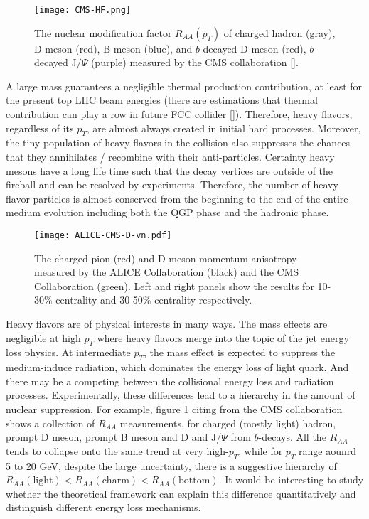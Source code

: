 \begin{figure}
\centering
\texttt{[image: CMS-HF.png]}
\caption{The nuclear modification factor $R_{AA}(p_T)$ of charged hadron (gray), D meson (red), B meson (blue), and $b$-decayed D meson (red), $b$-decayed J$/\Psi$ (purple) measured by the CMS collaboration [].}
\label{fig:intro:Raa}
\end{figure}

A large mass guarantees a negligible thermal production contribution, at least for the present top LHC beam energies (there are estimations that thermal contribution can play a row in future FCC collider []).
Therefore, heavy flavors, regardless of its $p_T$, are almost always created in initial hard processes.
Moreover, the tiny population of heavy flavors in the collision also suppresses the chances that they annihilates / recombine with their anti-particles.
Certainty heavy mesons have a long life time such that the decay vertices are outside of the fireball and can be resolved by experiments.
Therefore, the number of heavy-flavor particles is almost conserved from the beginning to the end of the entire medium evolution including both the QGP phase and the hadronic phase.

\begin{figure}
\centering
\texttt{[image: ALICE-CMS-D-vn.pdf]}
\caption{The charged pion (red) and D meson momentum anisotropy measured by the ALICE Collaboration (black) and the CMS Collaboration (green). Left and right panels show the results for 10-30\% centrality and 30-50\% centrality respectively.}
\label{fig:intro:D-vn}
\end{figure}

Heavy flavors are of physical interests in many ways.
The mass effects are negligible at high $p_T$ where heavy flavors merge into the topic of the jet energy loss physics.
At intermediate $p_T$, the mass effect is expected to suppress the medium-induce radiation, which dominates the energy loss of light quark.
And there may be a competing between the collisional energy loss and radiation processes.
Experimentally, these differences lead to a hierarchy in the amount of nuclear suppression.
For example, figure \ref{fig:intro:Raa} citing from the CMS collaboration shows a collection of $R_{AA}$ measurements, for charged (mostly light) hadron, prompt D meson, prompt B meson and D and J/$\Psi$ from $b$-decays.
All the $R_{AA}$ tends to collapse onto the same trend at very high-$p_T$, while for $p_T$ range aounrd 5 to 20 GeV, despite the large uncertainty, there is a suggestive hierarchy of $R_{AA}(\textrm{light}) < R_{AA}(\textrm{charm}) < R_{AA}(\textrm{bottom})$.
It would be interesting to study whether the theoretical framework can explain this difference quantitatively and distinguish different energy loss mechanisms.

